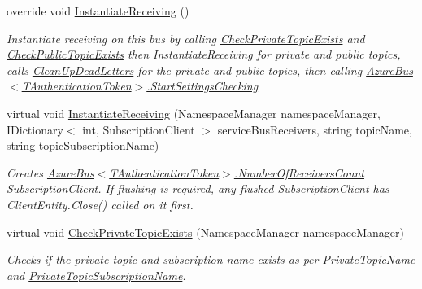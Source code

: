 \begin{DoxyCompactItemize}
override void \hyperlink{classCqrs_1_1Azure_1_1ServiceBus_1_1AzureServiceBus_ad49a2d063279ec98443e7f1d69178cfa_ad49a2d063279ec98443e7f1d69178cfa}{Instantiate\+Receiving} ()
\begin{DoxyCompactList}\small\item\em Instantiate receiving on this bus by calling \hyperlink{classCqrs_1_1Azure_1_1ServiceBus_1_1AzureServiceBus_add2d99ff99f1af5470082b1de340c04a_add2d99ff99f1af5470082b1de340c04a}{Check\+Private\+Topic\+Exists} and \hyperlink{classCqrs_1_1Azure_1_1ServiceBus_1_1AzureServiceBus_aae464d1d93ae6600ff5ace028160dd3c_aae464d1d93ae6600ff5ace028160dd3c}{Check\+Public\+Topic\+Exists} then Instantiate\+Receiving for private and public topics, calls \hyperlink{classCqrs_1_1Azure_1_1ServiceBus_1_1AzureServiceBus_a8d1d5833d49b7793933825f2a13fb8b7_a8d1d5833d49b7793933825f2a13fb8b7}{Clean\+Up\+Dead\+Letters} for the private and public topics, then calling \hyperlink{classCqrs_1_1Azure_1_1ServiceBus_1_1AzureBus_acb7f47329c17646805545e78d0776efe_acb7f47329c17646805545e78d0776efe}{Azure\+Bus$<$\+T\+Authentication\+Token$>$.\+Start\+Settings\+Checking} \end{DoxyCompactList}\item 
virtual void \hyperlink{classCqrs_1_1Azure_1_1ServiceBus_1_1AzureServiceBus_adba7b34f05055ed65baa54435a68321c_adba7b34f05055ed65baa54435a68321c}{Instantiate\+Receiving} (Namespace\+Manager namespace\+Manager, I\+Dictionary$<$ int, Subscription\+Client $>$ service\+Bus\+Receivers, string topic\+Name, string topic\+Subscription\+Name)
\begin{DoxyCompactList}\small\item\em Creates \hyperlink{classCqrs_1_1Azure_1_1ServiceBus_1_1AzureBus_a65ca2b61bf8f2dba9d0e0f54ec64c2b9_a65ca2b61bf8f2dba9d0e0f54ec64c2b9}{Azure\+Bus$<$\+T\+Authentication\+Token$>$.\+Number\+Of\+Receivers\+Count} Subscription\+Client. If flushing is required, any flushed Subscription\+Client has Client\+Entity.\+Close() called on it first. \end{DoxyCompactList}\item 
virtual void \hyperlink{classCqrs_1_1Azure_1_1ServiceBus_1_1AzureServiceBus_add2d99ff99f1af5470082b1de340c04a_add2d99ff99f1af5470082b1de340c04a}{Check\+Private\+Topic\+Exists} (Namespace\+Manager namespace\+Manager)
\begin{DoxyCompactList}\small\item\em Checks if the private topic and subscription name exists as per \hyperlink{classCqrs_1_1Azure_1_1ServiceBus_1_1AzureServiceBus_a7af8ebcdd25672ff2252085637904f82_a7af8ebcdd25672ff2252085637904f82}{Private\+Topic\+Name} and \hyperlink{classCqrs_1_1Azure_1_1ServiceBus_1_1AzureServiceBus_a22498d51bba26c801b3b553fb451a6ae_a22498d51bba26c801b3b553fb451a6ae}{Private\+Topic\+Subscription\+Name}. \end{DoxyCompactList}\item 

\end{DoxyCompactItemize}
